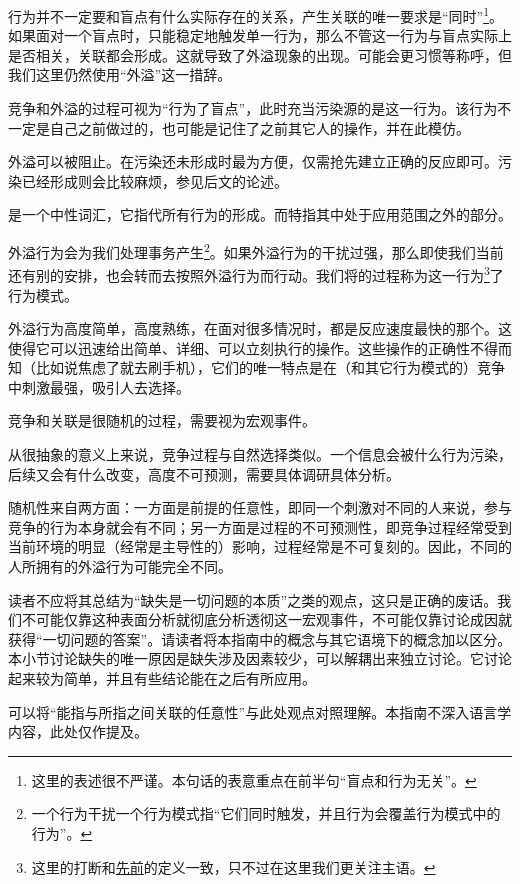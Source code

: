 \begin{examples}
行为并不一定要和盲点有什么实际存在的关系，产生关联的唯一要求是“同时”\footnote{这里的表述很不严谨。本句话的表意重点在前半句“盲点和行为无关”。}。如果面对一个盲点时，只能稳定地触发单一行为，那么不管这一行为与盲点实际上是否相关，关联都会形成。这就导致了外溢现象的出现。\trained 可能会更习惯等称呼，但我们这里仍然使用“外溢”这一措辞。

竞争和外溢的过程可视为“行为了盲点”，此时充当污染源的是这一行为。该行为不一定是自己之前做过的，也可能是记住了之前其它人的操作，并在此模仿。

外溢可以被阻止。在污染还未形成时最为方便，仅需抢先建立正确的反应即可。污染已经形成则会比较麻烦，参见后文的论述。

是一个中性词汇，它指代所有行为的形成。而特指其中处于应用范围之外的部分。
\end{examples}
外溢行为会为我们处理事务产生\footnote{一个行为干扰一个行为模式指“它们同时触发，并且行为会覆盖行为模式中的行为”。}。如果外溢行为的干扰过强，那么即使我们当前还有别的安排，也会转而去按照外溢行为而行动。我们将的过程称为这一行为\footnote{这里的打断和\hyperref[def:打断]{先前}的定义一致，只不过在这里我们更关注主语。}了行为模式。
\begin{explain}
外溢行为高度简单，高度熟练，在面对很多情况时，都是反应速度最快的那个。这使得它可以迅速给出简单、详细、可以立刻执行的操作。这些操作的正确性不得而知（比如说焦虑了就去刷手机），它们的唯一特点是在（和其它行为模式的）竞争中刺激最强，吸引人去选择。
\end{explain}
\label{para:竞争的随机性}竞争和关联是很随机的过程，需要视为宏观事件。
\begin{examples}
从很抽象的意义上来说，竞争过程与自然选择类似。一个信息会被什么行为污染，后续又会有什么改变，高度不可预测，需要具体调研具体分析。

随机性来自两方面：一方面是前提的任意性，即同一个刺激对不同的人来说，参与竞争的行为本身就会有不同；另一方面是过程的不可预测性，即竞争过程经常受到当前环境的明显（经常是主导性的）影响，过程经常是不可复刻的。因此，不同的人所拥有的外溢行为可能完全不同。

读者不应将其总结为“缺失是一切问题的本质”之类的观点，这只是正确的废话。我们不可能仅靠这种表面分析就彻底分析透彻这一宏观事件，不可能仅靠讨论成因就获得“一切问题的答案”。请读者将本指南中的概念与其它语境下的概念加以区分。本小节讨论缺失的唯一原因是缺失涉及因素较少，可以解耦出来独立讨论。它讨论起来较为简单，并且有些结论能在之后有所应用。

\trained 可以将“能指与所指之间关联的任意性”与此处观点对照理解。本指南不深入语言学内容，此处仅作提及。
\end{examples}

